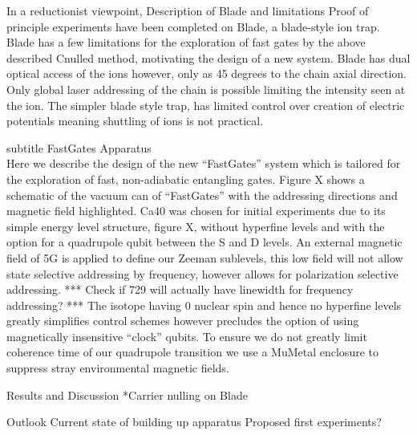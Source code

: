 \documentclass{article}
\begin{document}
In a reductionist viewpoint, 
Description of Blade and limitations Proof of principle experiments
have been completed on Blade, a blade-style ion trap. Blade has a few
limitations for the exploration of fast gates by the above described
Cnulled method, motivating the design of a new system.  Blade has dual
optical access of the ions however, only as 45 degrees to the chain
axial direction. Only global laser addressing of the chain is possible
limiting the intensity seen at the ion. The simpler blade style trap,
has limited control over creation of electric potentials meaning
shuttling of ions is not practical.


subtitle FastGates Apparatus\\

Here we describe the design of the new ``FastGates'' system which is
tailored for the exploration of fast, non-adiabatic entangling
gates. Figure X shows a schematic of the vacuum can of ``FastGates''
with the addressing directions and magnetic field highlighted. Ca40
was chosen for initial experiments due to its simple energy level
structure, figure X, without hyperfine levels and with the option for
a quadrupole qubit between the S and D levels. An external magnetic
field of 5G is applied to define our Zeeman sublevels, this low field
will not allow state selective addressing by frequency, however allows
for polarization selective addressing. *** Check if 729 will actually
have linewidth for frequency addressing? *** The isotope having 0
nuclear spin and hence no hyperfine levels greatly simplifies control
schemes however precludes the option of using magnetically insensitive
``clock'' qubits. To ensure we do not greatly limit coherence time of
our quadrupole transition we use a MuMetal enclosure to suppress stray
environmental magnetic fields.



Results and Discussion
    *Carrier nulling on Blade

Outlook
    Current state of building up apparatus
    Proposed first experiments?

  
\end{document}
